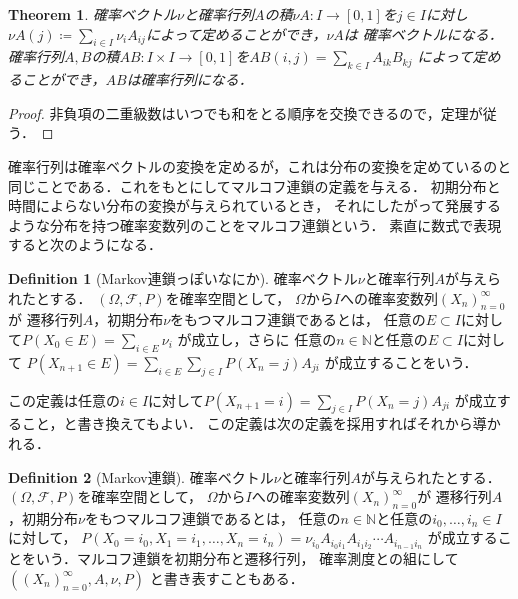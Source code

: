\documentclass[dvipdfmx,autodetect-engine]{jsarticle}
\newtheorem{theorem}{Theorem}[section]
\theoremstyle{remark}
\theoremstyle{definition}
\newtheorem{definition}{Definition}[section]
\newcommand{\N}{\mathbb{N}}
\begin{document}
\begin{theorem}
    確率ベクトル$\nu$と確率行列$A$の積$\nu A \colon I \to [0,1]$を$j \in I$に対し
    $\nu A (j) \coloneqq \sum_{i \in I} \nu_i A_{ij}$によって定めることができ，$\nu A$は
    確率ベクトルになる．
    確率行列$A,B$の積$AB \colon I\times I \to [0,1]$を$AB(i,j) = \sum_{k \in I} A_{ik}B_{kj}$
    によって定めることができ，$AB$は確率行列になる．
\end{theorem}


\begin{proof}
    非負項の二重級数はいつでも和をとる順序を交換できるので，定理が従う．
\end{proof}


確率行列は確率ベクトルの変換を定めるが，これは分布の変換を定めているのと
同じことである．これをもとにしてマルコフ連鎖の定義を与える．
初期分布と時間によらない分布の変換が与えられているとき，
それにしたがって発展するような分布を持つ確率変数列のことをマルコフ連鎖という．
素直に数式で表現すると次のようになる．

\begin{definition}[Markov連鎖っぽいなにか]
    確率ベクトル$\nu$と確率行列$A$が与えられたとする．
    $(\Omega,\mathcal{F},P)$を確率空間として，
    $\Omega$から$I$への確率変数列$(X_n)_{n=0}^{\infty}$が
    遷移行列$A$，初期分布$\nu$をもつマルコフ連鎖であるとは，
    任意の$E \subset I$に対して$P(X_0 \in E) = \sum_{i \in E} \nu_{i}$
    が成立し，さらに
    任意の$n\in \N$と任意の$E \subset I$に対して
    $P(X_{n+1}\in E)=\sum_{i \in E} \sum_{j \in I} P(X_n = j) A_{ji}$
    が成立することをいう．
\end{definition}

この定義は任意の$i \in I$に対して$P(X_{n+1} = i)= \sum_{j \in I} P(X_n = j) A_{ji}$
が成立すること，と書き換えてもよい．
この定義は次の定義を採用すればそれから導かれる．


\begin{definition}[Markov連鎖]
    確率ベクトル$\nu$と確率行列$A$が与えられたとする．
    $(\Omega,\mathcal{F},P)$を確率空間として，
    $\Omega$から$I$への確率変数列$(X_n)_{n=0}^{\infty}$が
    遷移行列$A$，初期分布$\nu$をもつマルコフ連鎖であるとは，
    任意の$n \in \N$と任意の$i_0,\ldots,i_{n} \in I$に対して，
    $P(X_{0} = i_{0}, X_{1}=i_{1},\ldots,X_n = i_n) = 
    \nu_{i_0} A_{i_0 i_1} A_{i_1 i_2}\cdots A_{i_{n-1} i_n}$
    が成立することをいう．マルコフ連鎖を初期分布と遷移行列，
    確率測度との組にして$((X_n)_{n=0}^{\infty},A,\nu,P)$
    と書き表すこともある．
\end{definition}
\end{document}
